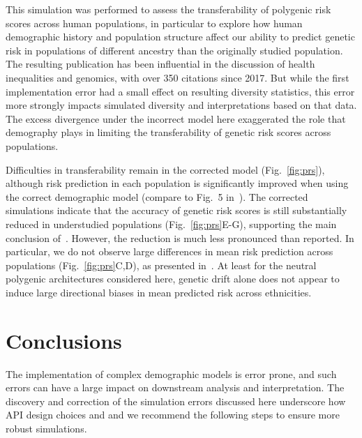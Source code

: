 \documentclass{article}
\begin{document}
This simulation was performed to assess the
transferability of polygenic risk scores across human populations, in particular to
explore how human demographic history and population structure affect our ability
to predict genetic risk in populations of different ancestry than the originally studied
population.
The resulting publication has been influential in the discussion of
health inequalities and genomics, with over 350 citations since 2017.
But while the first implementation error had a small effect on resulting diversity statistics,
this error more strongly impacts simulated diversity and interpretations based on that data.
The excess divergence under the incorrect model here exaggerated the role that demography
plays in limiting the transferability of genetic risk scores across populations.

Difficulties in transferability remain in the corrected model (Fig.~\ref{fig:prs}), although
risk prediction in each population is significantly improved when using the correct
demographic model (compare to Fig.~5 in~\citet{martin2017human}).
The corrected simulations indicate that the accuracy of genetic risk scores is still
substantially reduced in understudied populations (Fig.~\ref{fig:prs}E-G),
supporting the main conclusion of~\citet{martin2017human}.
However, the reduction is much less pronounced than reported.
In particular, we do not observe large differences in mean risk prediction
across populations (Fig.~\ref{fig:prs}C,D), as presented in~\citet{martin2017human}.
At least for the neutral polygenic architectures considered here, genetic drift alone
does not appear to induce large directional biases in mean predicted risk across ethnicities.

\section{Conclusions}

The implementation of complex demographic models is error prone, and such errors
can have a large impact on downstream analysis and interpretation. 
The discovery and correction of the simulation errors discussed here underscore
how API design choices and 
and we recommend the following steps to ensure more robust simulations.
\end{document}
